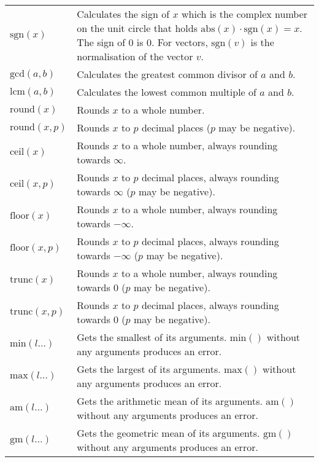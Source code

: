 \documentclass[10pt]{article}
\newcommand{\tabgap}{\vspace{3mm}\\}
\begin{document}
\begin{longtable}{p{}p{}}
        $ \mathrm{sgn}(x) $                        & Calculates the sign of $ x $ which is the complex number on the unit circle that holds $ \mathrm{abs}(x) \cdot \mathrm{sgn}(x) = x $. The sign of $ 0 $ is $ 0 $. For vectors, $ \mathrm{sgn}(v) $ is the normalisation of the vector $ v $. \tabgap
        $ \mathrm{gcd}(a, b) $                     & Calculates the greatest common divisor of $ a $ and $ b $. \\
        $ \mathrm{lcm}(a, b) $                     & Calculates the lowest common multiple of $ a $ and $ b $. \tabgap
        $ \mathrm{round}(x) $                      & Rounds $ x $ to a whole number. \\
        $ \mathrm{round}(x, p) $                   & Rounds $ x $ to $ p $ decimal places ($ p $ may be negative). \\
        $ \mathrm{ceil}(x) $                       & Rounds $ x $ to a whole number, always rounding towards $ \infty $. \\
        $ \mathrm{ceil}(x, p) $                    & Rounds $ x $ to $ p $ decimal places, always rounding towards $ \infty $ ($ p $ may be negative). \\
        $ \mathrm{floor}(x) $                      & Rounds $ x $ to a whole number, always rounding towards $ -\infty $. \\
        $ \mathrm{floor}(x, p) $                   & Rounds $ x $ to $ p $ decimal places, always rounding towards $ -\infty $ ($ p $ may be negative). \\
        $ \mathrm{trunc}(x) $                      & Rounds $ x $ to a whole number, always rounding towards $ 0 $ ($ p $ may be negative). \\
        $ \mathrm{trunc}(x, p) $                   & Rounds $ x $ to $ p $ decimal places, always rounding towards $ 0 $ ($ p $ may be negative). \tabgap
        $ \mathrm{min}(l\dots) $                   & Gets the smallest of its arguments. $ \mathrm{min}() $ without any arguments produces an error. \\
        $ \mathrm{max}(l\dots) $                   & Gets the largest of its arguments. $ \mathrm{max}() $ without any arguments produces an error. \\
        $ \mathrm{am}(l\dots) $                    & Gets the arithmetic mean of its arguments. $ \mathrm{am}() $ without any arguments produces an error. \\
        $ \mathrm{gm}(l\dots) $                    & Gets the geometric mean of its arguments. $ \mathrm{gm}() $ without any arguments produces an error. \\

\end{longtable}
\end{document}
